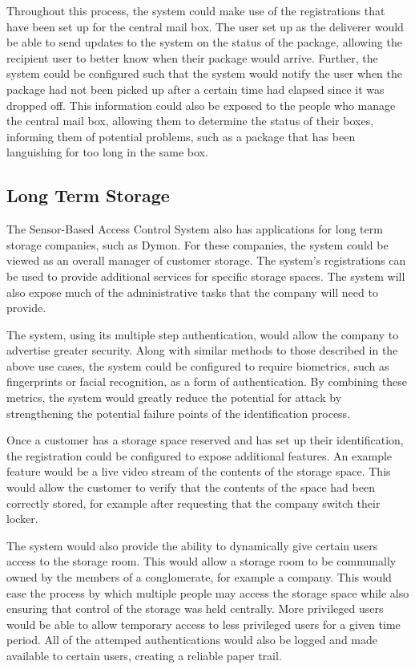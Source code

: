 \documentclass{article}
\begin{document}
Throughout this process, the system could make use of the registrations that have been set up for the central mail
box. The user set up as the deliverer would be able to send updates to the system on the status of the package, allowing
the recipient user to better know when their package would arrive. Further, the system could be configured such that the
system would notify the user when the package had not been picked up after a certain time had elapsed since it was
dropped off. This information could also be exposed to the people who manage the central mail box, allowing them to
determine the status of their boxes, informing them of potential problems, such as a package that has been languishing
for too long in the same box.

\subsection{Long Term Storage}

The Sensor-Based Access Control System also has applications for long term storage companies, such as Dymon. For these 
companies, the system could be viewed as an overall manager of customer storage. The system's registrations can be used 
to provide additional services for specific storage spaces. The system will also expose much of the administrative 
tasks that the company will need to provide.

The system, using its multiple step authentication, would allow the company to advertise greater security. Along with
similar methods to those described in the above use cases, the system could be configured to require biometrics, such
as fingerprints or facial recognition, as a form of authentication. By combining these metrics, the system would greatly
reduce the potential for attack by strengthening the potential failure points of the identification process.

Once a customer has a storage space reserved and has set up their identification, the registration could be configured
to expose additional features. An example feature would be a live video stream of the contents of the storage space.
This would allow the customer to verify that the contents of the space had been correctly stored, for example after
requesting that the company switch their locker.

The system would also provide the ability to dynamically give certain users access to the storage room. This would allow
a storage room to be communally owned by the members of a conglomerate, for example a company. This would ease the
process by which multiple people may access the storage space while also ensuring that control of the storage was held
centrally. More privileged users would be able to allow temporary access to less privileged users for a given time
period. All of the attemped authentications would also be logged and made available to certain users, creating a
reliable paper trail.
\end{document}

